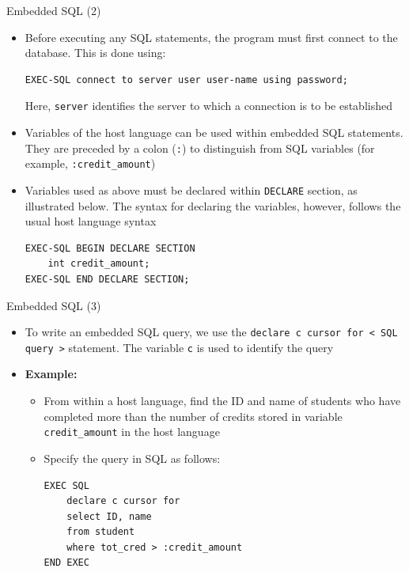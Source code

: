 \documentclass[aspectratio=169, xcolor=dvipsnames]{beamer}
\begin{document}
\begin{frame}[fragile]{Embedded SQL (2)}
    \begin{itemize}
        \item Before executing any SQL statements, the program must first connect to the database. This is done using:
        \begin{verbatim}
EXEC-SQL connect to server user user-name using password;
        \end{verbatim}
        Here, \texttt{server} identifies the server to which a connection is to be established
        \item Variables of the host language can be used within embedded SQL statements. They are preceded by a colon (\texttt{:}) to distinguish from SQL variables (for example, \texttt{:credit\_amount})
        \item Variables used as above must be declared within \texttt{DECLARE} section, as illustrated below. The syntax for declaring the variables, however, follows the usual host language syntax
        \begin{verbatim}
EXEC-SQL BEGIN DECLARE SECTION
    int credit_amount;
EXEC-SQL END DECLARE SECTION;
        \end{verbatim}
    \end{itemize}
\end{frame}

\begin{frame}[fragile]{Embedded SQL (3)}
    \begin{itemize}
        \item To write an embedded SQL query, we use the \texttt{declare c cursor for < SQL query >} statement. The variable \texttt{c} is used to identify the query
        \item \textbf{Example:}
        \begin{itemize}
            \item From within a host language, find the ID and name of students who have completed more than the number of credits stored in variable \texttt{credit\_amount} in the host language
            \item Specify the query in SQL as follows:
            \begin{verbatim}
EXEC SQL
    declare c cursor for
    select ID, name
    from student
    where tot_cred > :credit_amount
END EXEC
            \end{verbatim}
        \end{itemize}
    \end{itemize}
\end{frame}
\end{document}
